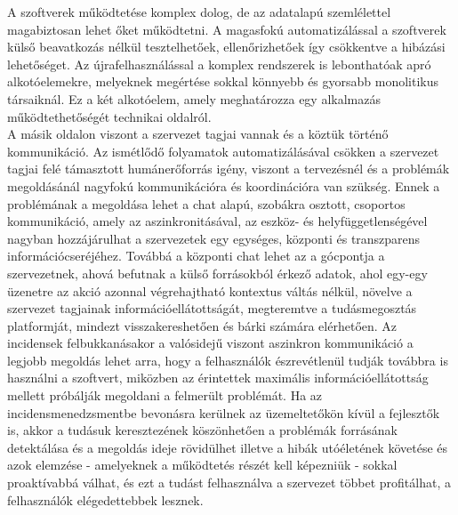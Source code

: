 A szoftverek működtetése komplex dolog, de az adatalapú szemlélettel magabiztosan lehet őket működtetni. A magasfokú automatizálással a szoftverek külső beavatkozás nélkül tesztelhetőek, ellenőrizhetőek így csökkentve a hibázási lehetőséget. Az újrafelhasználással a komplex rendszerek is lebonthatóak apró alkotóelemekre, melyeknek megértése sokkal könnyebb és gyorsabb monolitikus társaiknál. Ez a két alkotóelem, amely meghatározza egy alkalmazás működtethetőségét technikai oldalról.\hfill\\
A másik oldalon viszont a szervezet tagjai vannak és a köztük történő kommunikáció. Az ismétlődő folyamatok automatizálásával csökken a szervezet tagjai felé támasztott humánerőforrás igény, viszont a tervezésnél és a problémák megoldásánál nagyfokú kommunikációra és koordinációra van szükség. Ennek a problémának a megoldása lehet a chat alapú, szobákra osztott, csoportos kommunikáció, amely az aszinkronitásával, az eszköz- és helyfüggetlenségével nagyban hozzájárulhat a szervezetek egy egységes, központi és transzparens információcseréjéhez. Továbbá a központi chat lehet az a gócpontja a szervezetnek, ahová befutnak a külső forrásokból érkező adatok, ahol egy-egy üzenetre az akció azonnal végrehajtható kontextus váltás nélkül, növelve a szervezet tagjainak információellátottságát, megteremtve a tudásmegosztás platformját, mindezt visszakereshetően és bárki számára elérhetően. Az incidensek felbukkanásakor a valósidejű viszont aszinkron kommunikáció a legjobb megoldás lehet arra, hogy a felhasználók észrevétlenül tudják továbbra is használni a szoftvert, miközben az érintettek maximális információellátottság mellett próbálják megoldani a felmerült problémát. Ha az incidensmenedzsmentbe bevonásra kerülnek az üzemeltetőkön kívül a fejlesztők is, akkor a tudásuk keresztezének köszönhetően a problémák forrásának detektálása és a megoldás ideje rövidülhet illetve a hibák utóéletének követése és azok elemzése - amelyeknek a működtetés részét kell képezniük - sokkal proaktívabbá válhat, és ezt a tudást felhasználva a szervezet többet profitálhat, a felhasználók elégedettebbek lesznek.




